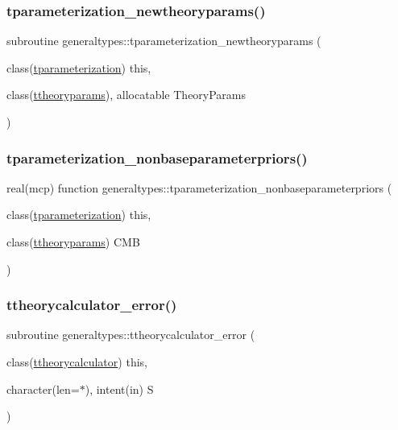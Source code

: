 \subsubsection{\texorpdfstring{tparameterization\+\_\+newtheoryparams()}{tparameterization\_newtheoryparams()}}
{\footnotesize\ttfamily subroutine generaltypes\+::tparameterization\+\_\+newtheoryparams (\begin{DoxyParamCaption}\item[{class(\mbox{\hyperlink{structgeneraltypes_1_1tparameterization}{tparameterization}})}]{this,  }\item[{class(\mbox{\hyperlink{structgeneraltypes_1_1ttheoryparams}{ttheoryparams}}), allocatable}]{Theory\+Params }\end{DoxyParamCaption})\hspace{0.3cm}{\ttfamily [private]}}

\mbox{\label{namespacegeneraltypes_ad583eb4db9430c5b495f21cc9863017d}} 
\subsubsection{\texorpdfstring{tparameterization\+\_\+nonbaseparameterpriors()}{tparameterization\_nonbaseparameterpriors()}}
{\footnotesize\ttfamily real(mcp) function generaltypes\+::tparameterization\+\_\+nonbaseparameterpriors (\begin{DoxyParamCaption}\item[{class(\mbox{\hyperlink{structgeneraltypes_1_1tparameterization}{tparameterization}})}]{this,  }\item[{class(\mbox{\hyperlink{structgeneraltypes_1_1ttheoryparams}{ttheoryparams}})}]{C\+MB }\end{DoxyParamCaption})\hspace{0.3cm}{\ttfamily [private]}}

\mbox{\label{namespacegeneraltypes_aa6c88f0919f7ac7fa030824300d48018}} 
\subsubsection{\texorpdfstring{ttheorycalculator\+\_\+error()}{ttheorycalculator\_error()}}
{\footnotesize\ttfamily subroutine generaltypes\+::ttheorycalculator\+\_\+error (\begin{DoxyParamCaption}\item[{class(\mbox{\hyperlink{structgeneraltypes_1_1ttheorycalculator}{ttheorycalculator}})}]{this,  }\item[{character(len=$\ast$), intent(in)}]{S }\end{DoxyParamCaption})\hspace{0.3cm}{\ttfamily [private]}}

